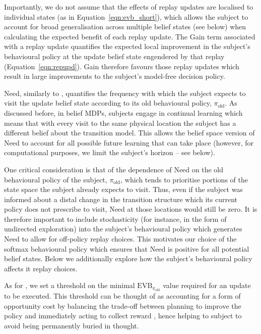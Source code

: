 Importantly, we do not assume that the effects of replay updates are localised to individual states (as in Equation~\ref{eqn:evb_short}), which allows the subject to account for broad generalisation across multiple belief states (see below) when calculating the expected benefit of each replay update. The Gain term associated with a replay update quantifies the expected local improvement in the subject's behavioural policy at the update belief state engendered by that replay (Equation~\ref{eqn:repupd}). Gain therefore favours those replay updates which result in large improvements to the subject's model-free decision policy.

Need, similarly to \textcite{mattarPrioritizedMemoryAccess2018}, quantifies the frequency with which the subject expects to visit the update belief state according to its old behavioural policy, $\pi_{\text{old}}$. As discussed before, in belief MDPs, subjects engage in continual learning which means that with every visit to the same physical location the subject has a different belief about the transition model. This allows the belief space version of Need to account for all possible future learning that can take place (however, for computational purposes, we limit the subject's horizon -- see below).

One critical consideration is that of the dependence of Need on the old behavioural policy of the subject, $\pi_{\text{old}}$, which tends to prioritise portions of the state space the subject already expects to visit. Thus, even if the subject was informed about a distal change in the transition structure which its current policy does not prescribe to visit, Need at those locations would still be zero. It is therefore important to include stochasticity (for instance, in the form of undirected exploration) into the subject's behavioural policy which generates Need to allow for off-policy replay choices. This motivates our choice of the softmax behavioural policy which ensures that Need is positive for all potential belief states. Below we additionally explore how the subject's behavioural policy affects it replay choices. 

As for \textcite{mattarPrioritizedMemoryAccess2018}, we set a threshold on the minimal $\text{EVB}_{\pi_{\text{old}}}$ value required for an update to be executed. This threshold can be thought of as accounting for a form of opportunity cost by balancing the trade-off between planning to improve the policy and immediately acting to collect reward \parencite{nivTonicDopamineOpportunity2007}, hence helping to subject to avoid being permanently buried in thought.

